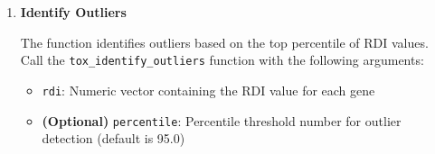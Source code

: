 \begin{enumerate}
\begin{enumerate}
                  \begin{itemize}
                    \item \texttt{distances}: Numeric vector of distances for each gene to
                          its centroid
                          
                    \item \texttt{gene\_to\_fam}: Gene-to-family mapping integer vector mapping
                          with the same length as the distances vector (0 = no family, \textgreater
                          0 = family index)
                          
                    \item \textbf{dscale}: Numeric vector of scaling factors per family
                  \end{itemize}
                  
                  \textbf{Return list:}
                  \begin{itemize}
                    \item \texttt{rdi}: Numeric vector containing the RDI value for each
                          gene
                          
                    \item \texttt{sorted\_rdi}: Numeric vector containing the RDI values
                          sorted in ascending order
                  \end{itemize}
                  
                  \begin{lstlisting}[language=R, caption={R Compute Relative Distance Index (RDI)}]
tox_compute_rdi(distances, gene_to_fam, dscale)
                  \end{lstlisting}
                  
            \item \textbf{Identify Outliers}
                  
                  The function identifies outliers based on the top percentile of RDI values.
                  Call the \texttt{tox\_identify\_outliers} function with the following arguments:
                  
                  \begin{itemize}
                    \item \texttt{rdi}: Numeric vector containing the RDI value for each
                          gene
                          
                    \item \textbf{(Optional)} \texttt{percentile}: Percentile threshold
                          number for outlier detection (default is 95.0)
                  \end{itemize}
                  

\end{enumerate}
\end{enumerate}
